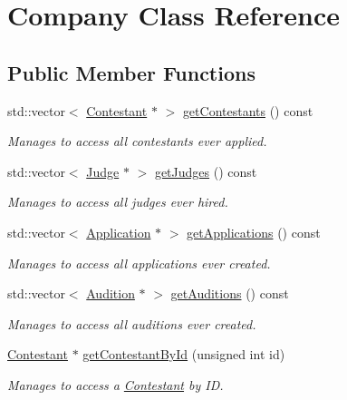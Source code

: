 \hypertarget{class_company}{}\section{Company Class Reference}
\label{class_company}
\subsection*{Public Member Functions}
\begin{DoxyCompactItemize}
\item 
std\+::vector$<$ \hyperlink{class_contestant}{Contestant} $\ast$ $>$ \hyperlink{class_company_a3e0b5c137e22060961b27332396384ca}{get\+Contestants} () const
\begin{DoxyCompactList}\small\item\em Manages to access all contestants ever applied. \end{DoxyCompactList}\item 
std\+::vector$<$ \hyperlink{class_judge}{Judge} $\ast$ $>$ \hyperlink{class_company_a287cc3acf891e584e630eced10eba45a}{get\+Judges} () const
\begin{DoxyCompactList}\small\item\em Manages to access all judges ever hired. \end{DoxyCompactList}\item 
std\+::vector$<$ \hyperlink{class_application}{Application} $\ast$ $>$ \hyperlink{class_company_ac47e9c6c7a5b9cf67a685f14bde2f103}{get\+Applications} () const
\begin{DoxyCompactList}\small\item\em Manages to access all applications ever created. \end{DoxyCompactList}\item 
std\+::vector$<$ \hyperlink{class_audition}{Audition} $\ast$ $>$ \hyperlink{class_company_a9d2d2e8bdad7bccc57324100de3c3e5b}{get\+Auditions} () const
\begin{DoxyCompactList}\small\item\em Manages to access all auditions ever created. \end{DoxyCompactList}\item 
\hyperlink{class_contestant}{Contestant} $\ast$ \hyperlink{class_company_a9a633866abe6cc598bb290498dc3d7ad}{get\+Contestant\+By\+Id} (unsigned int id)
\begin{DoxyCompactList}\small\item\em Manages to access a \hyperlink{class_contestant}{Contestant} by ID. \end{DoxyCompactList}\item 

\end{DoxyCompactItemize}
